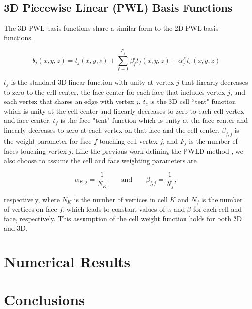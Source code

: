 \subsection{3D Piecewise Linear (PWL) Basis Functions}
\label{sec::BF_3D_PWL}

The 3D PWL basis functions share a similar form to the 2D PWL basis functions.

\begin{equation}
\label{eq::PWL_3D}
	b_j (x,y,z)  = t_j  (x,y,z) + \sum_{f=1}^{F_j} \beta_f^j  t_f (x,y,z) + \alpha_j^K t_c  (x,y,z)
\end{equation}

\noindent $t_j$ is the standard 3D linear function with unity at vertex $j$ that linearly decreases to zero to the cell center, the face center for each face that includes vertex $j$, and each vertex that shares an edge with vertex $j$. $t_c$ is the 3D cell ``tent" function which is unity at the cell center and linearly decreases to zero to each cell vertex and face center. $t_f$ is the face "tent" function which is unity at the face center and linearly decreases to zero at each vertex on that face and the cell center. $\beta_{f,j}$ is the weight parameter for face $f$ touching cell vertex $j$, and $F_j$ is the number of faces touching vertex $j$. Like the previous work defining the PWLD method \cite{bailey2008phd}, we also choose to assume the cell and face weighting parameters are

\begin{equation}
\alpha_{K,j} = \frac{1}{N_K} \qquad \text{and} \qquad \beta_{f,j} = \frac{1}{N_f},
\label{eq::PWL_weight_vals}
\end{equation}

\noindent respectively, where $N_K$ is the number of vertices in cell $K$ and $N_f$ is the number of vertices on face $f$, which leads to constant values of $\alpha$ and $\beta$ for each cell and face, respectively. This assumption of the cell weight function holds for both 2D and 3D.

\section{Numerical Results}
\label{sec::BF_Results}


\section{Conclusions}
\label{sec::BF_Conclusions}









